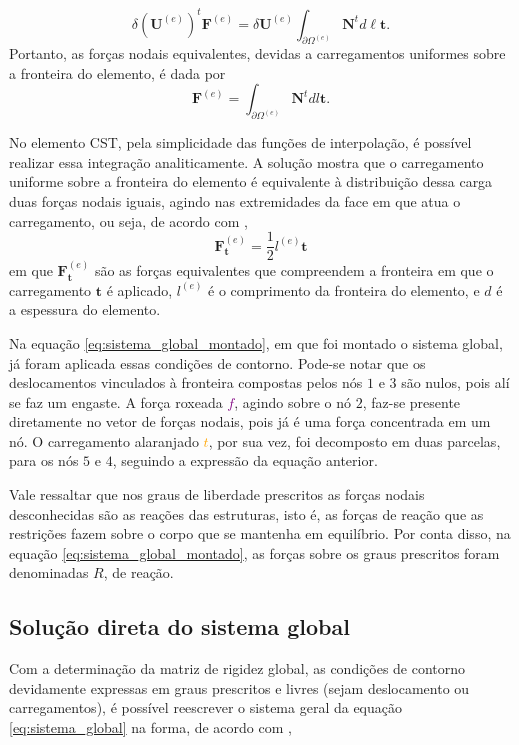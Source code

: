 \begin{equation}
    \delta (\bm{U}^{(e)})^t \bm{F}^{(e)} = \delta \bm{U}^{(e)} \int_{\partial \Omega^{(e)}} \bm{N}^t d\ell \bm{t}. 
\end{equation}
Portanto, as forças nodais equivalentes, devidas a carregamentos uniformes sobre a fronteira do elemento, é dada por
\begin{equation}
    \bm{F}^{(e)} = \int_{\partial \Omega^{(e)}} \bm{N}^t dl \bm{t}.
\end{equation}

No elemento CST, pela simplicidade das funções de interpolação, é possível realizar essa integração analiticamente. A solução mostra que o carregamento uniforme sobre a fronteira do elemento é equivalente à distribuição dessa carga duas forças nodais iguais, agindo nas extremidades da face em que atua o carregamento, ou seja, de acordo com \cite{Onate},
\begin{equation}
    \bm{F}^{(e)}_{\bm{t}} = \frac{1}{2} l^{(e)} \bm{t}
\end{equation}
em que $\bm{F}^{(e)}_{\bm{t}}$ são as forças equivalentes que compreendem a fronteira em que o carregamento $\bm{t}$ é aplicado, $l^{(e)}$ é o comprimento da fronteira do elemento, e $d$ é a espessura do elemento.

Na equação \ref{eq:sistema_global_montado}, em que foi montado o sistema global, já foram aplicada essas condições de contorno. Pode-se notar que os deslocamentos vinculados à fronteira compostas pelos nós $1$ e $3$ são nulos, pois alí se faz um engaste. A força roxeada \textcolor{purple}{$f$}, agindo sobre o nó $2$, faz-se presente diretamente no vetor de forças nodais, pois já é uma força concentrada em um nó. O carregamento alaranjado \textcolor{orange}{$t$}, por sua vez, foi decomposto em duas parcelas, para os nós $5$ e $4$, seguindo a expressão da equação anterior. 

Vale ressaltar que nos graus de liberdade prescritos as forças nodais desconhecidas são as reações das estruturas, isto é, as forças de reação que as restrições fazem sobre o corpo que se mantenha em equilíbrio. Por conta disso, na equação \ref{eq:sistema_global_montado}, as forças sobre os graus prescritos foram denominadas $R$, de reação.

\subsection{Solução direta do sistema global}

Com a determinação da matriz de rigidez global, as condições de contorno devidamente expressas em graus prescritos e livres (sejam deslocamento ou carregamentos), é possível reescrever o sistema geral da equação \ref{eq:sistema_global} na forma, de acordo com ,

